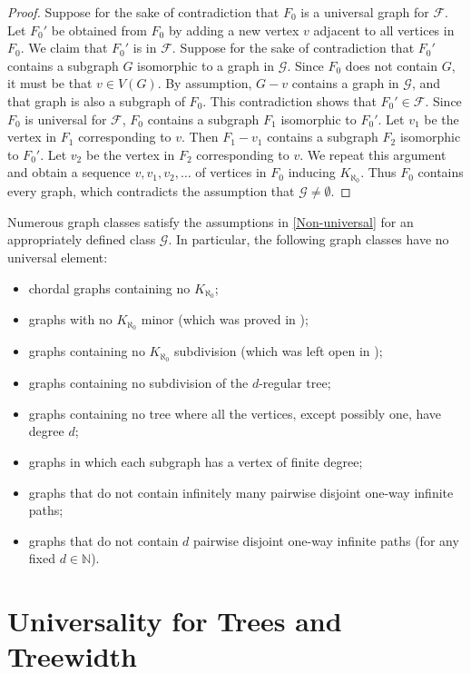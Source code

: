 \documentclass[a4paper,11pt]{article}
\theoremstyle{plain}
\theoremstyle{definition}
\newcommand{\FF}{\mathcal{F}}
\newcommand{\GG}{\mathcal{G}}
\newcommand{\NN}{\mathbb{N}}
\begin{document}
\begin{proof}
Suppose for the sake of contradiction that $F_0$ is a universal graph for $\FF$. Let $F_0'$ be obtained from $F_0$ by adding a new vertex $v$ adjacent to all vertices in $F_0$. We claim that $F_0'$ is in $\FF$. Suppose 
for the sake of contradiction that $F_0'$ contains a subgraph $G$ isomorphic to a graph in $\GG$. Since $F_0$ does not contain $G$, it must be that $v\in V(G)$. By assumption, $G-v$ contains a graph in $\GG$, and that graph is also a subgraph of $F_0$. This contradiction shows that $F_0'\in \FF$. Since $F_0$ is universal for $\FF$, $F_0$ contains a subgraph $F_1$ isomorphic to $F_0'$. Let $v_1$ be the vertex in $F_1$ corresponding to $v$. Then $F_1-v_1$ contains a subgraph $F_2$ isomorphic to $F_0'$. Let $v_2$ be the vertex in $F_2$ corresponding to $v$. We repeat this argument and obtain a sequence $v,v_1,v_2, \ldots$ of vertices in $F_0$ inducing $K_{\aleph_0}$. Thus $F_0$ contains every graph, which contradicts the assumption that $\GG\neq\emptyset$.
\end{proof}

Numerous graph classes satisfy the assumptions in \cref{Non-universal} for an appropriately defined class $\GG$. In particular, the following graph classes have no universal element:
\begin{itemize}
\item chordal graphs containing no $K_{\aleph_0}$;
\item graphs with no $K_{\aleph_0}$ minor (which was proved in \cite{DHV85});
\item graphs containing no $K_{\aleph_0}$ subdivision (which was left open in \cite{DHV85});
\item graphs containing no subdivision of the $d$-regular tree;
\item graphs containing no tree where all the vertices, except possibly one, have degree $d$; 
\item graphs in which each subgraph has a vertex of finite degree;
\item graphs that do not contain infinitely many pairwise disjoint one-way infinite paths; 
\item graphs that do not contain $d$ pairwise disjoint one-way infinite paths (for any fixed $d\in\NN$).
\end{itemize}

\section{Universality for Trees and Treewidth}
\label{TreesTreewidth}
\end{document}
